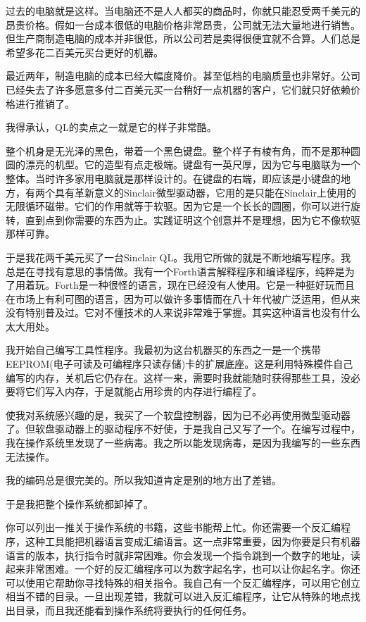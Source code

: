 过去的电脑就是这样。当电脑还不是人人都买的商品时，你就只能忍受两千美元的昂贵价格。假如一台成本很低的电脑价格非常昂贵，公司就无法大量地进行销售。但生产商制造电脑的成本并非很低，所以公司若是卖得很便宜就不合算。人们总是希望多花二百美元买台更好的机器。

最近两年，制造电脑的成本已经大幅度降价。甚至低档的电脑质量也非常好。公司已经失去了许多愿意多付二百美元买一台稍好一点机器的客户，它们就只好依赖价格进行推销了。

我得承认，QL的卖点之一就是它的样子非常酷。

整个机身是无光泽的黑色，带着一个黑色键盘。整个样子有棱有角，而不是那种圆圆的漂亮的机型。它的造型有点走极端。键盘有一英尺厚，因为它与电脑联为一个整体。当时许多家用电脑就是那样设计的。在键盘的右端，即应该是小键盘的地方，有两个具有革新意义的Sinclair微型驱动器，它用的是只能在Sinclair上使用的无限循环磁带。它们的作用就等于软驱。因为它是一个长长的圆圈，你可以进行旋转，直到点到你需要的东西为止。实践证明这个创意并不是理想，因为它不像软驱那样可靠。

于是我花两千美元买了一台Sinclair QL。我用它所做的就是不断地编写程序。我总是在寻找有意思的事情做。我有一个Forth语言解释程序和编译程序，纯粹是为了用着玩。Forth是一种很怪的语言，现在已经没有人使用。它是一种挺好玩而且在市场上有利可图的语言，因为可以做许多事情而在八十年代被广泛运用，但从来没有特别普及过。它对不懂技术的人来说非常难于掌握。其实这种语言也没有什么太大用处。

我开始自己编写工具性程序。我最初为这台机器买的东西之一是一个携带EEPROM(电子可读及可编程序只读存储)卡的扩展底座。这是利用特殊模件自己编写的内存，关机后它仍存在。这样一来，需要时我就能随时获得那些工具，没必要将它们写入内存，于是就能占用珍贵的内存进行编程了。

使我对系统感兴趣的是，我买了一个软盘控制器，因为已不必再使用微型驱动器了。但软盘驱动器上的驱动程序不好使，于是我自己又写了一个。在编写过程中，我在操作系统里发现了一些病毒。我之所以能发现病毒，是因为我编写的一些东西无法操作。

我的编码总是很完美的。所以我知道肯定是别的地方出了差错。

于是我把整个操作系统都卸掉了。

你可以列出一推关于操作系统的书籍，这些书能帮上忙。你还需要一个反汇编程序，这种工具能把机器语言变成汇编语言。这一点非常重要，因为你要是只有机器语言的版本，执行指令时就非常困难。你会发现一个指令跳到一个数字的地址，读起来非常困难。一个好的反汇编程序可以为数字起名字，也可以让你起名字。你还可以使用它帮助你寻找特殊的相关指令。我自己有一个反汇编程序，可以用它创立相当不错的目录。一旦出现差错，我就可以进入反汇编程序，让它从特殊的地点找出目录，而且我还能看到操作系统将要执行的任何任务。


